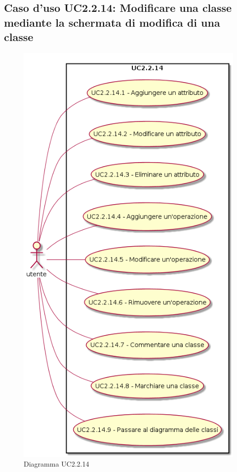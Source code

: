 \documentclass[../AnalisiDeiRequisiti.tex]{subfiles}
\begin{document}
			\subsection{Caso d'uso UC2.2.14: Modificare una classe mediante la schermata di modifica di una classe}
			\begin{figure} [H]
				\centering
				\includegraphics[scale=0.45]{./Figures/UC2-2-14.png}
				\caption{Diagramma UC2.2.14}\label{}
			\end{figure}
\end{document}
